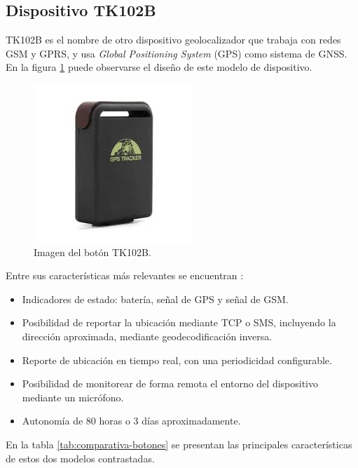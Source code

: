 \subsection{Dispositivo TK102B}

TK102B es el nombre de otro dispositivo geolocalizador que trabaja con redes GSM y GPRS, y usa \textit{Global Positioning System} (GPS) como sistema de GNSS. En la figura \ref{fig:botontk102b} puede observarse el diseño de este modelo de dispositivo.

\begin{figure}[H]
	\centering
	\includegraphics[width=.6\textwidth]{./Figures/tk102b.jpg}
	\caption{Imagen del botón TK102B.}
	\label{fig:botontk102b}
\end{figure}

Entre sus características más relevantes se encuentran \citep{TK102BMANUAL:1}:
\begin{itemize}
\item Indicadores de estado: batería, señal de GPS y señal de GSM.
\item Posibilidad de reportar la ubicación mediante TCP o SMS, incluyendo la dirección aproximada, mediante geodecodificación inversa.
\item Reporte de ubicación en tiempo real, con una periodicidad configurable.
\item Posibilidad de monitorear de forma remota el entorno del dispositivo mediante un micrófono.
\item Autonomía de 80 horas o 3 días aproximadamente.
\end{itemize}

\pagebreak

En la tabla \ref{tab:comparativa-botones} se presentan las principales características de estos dos modelos contrastadas.


